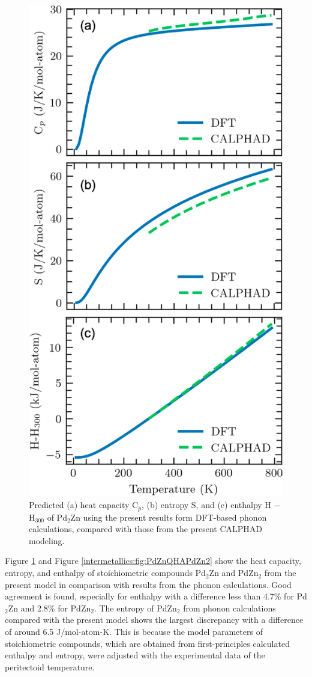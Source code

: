 \begin{figure}[H]
    \centering
    \includegraphics[width=0.45\linewidth]{intermetallics/Intermetallics-PdZnQHAPd2Zn.jpg}
    \caption{Predicted (a) heat capacity C$_p$, (b) entropy S, and (c) enthalpy H $-$ H$_{300}$ of Pd$_2$Zn using the present results form DFT-based phonon calculations, compared with those from the present CALPHAD modeling.}
    \label{intermetallics:fig:PdZnQHAPd2Zn}
\end{figure}

Figure \ref{intermetallics:fig:PdZnQHAPd2Zn} and Figure \ref{intermetallics:fig:PdZnQHAPdZn2} show the heat capacity, entropy, and enthalpy of stoichiometric compounds Pd$_2$Zn and PdZn$_2$ from the present model in comparison with results from the phonon calculations. Good agreement is found, especially for enthalpy with a difference less than 4.7\% for Pd$_2$Zn and 2.8\% for PdZn$_2$. The entropy of PdZn$_2$ from phonon calculations compared with the present model shows the largest discrepancy with a difference of around 6.5 J/mol-atom-K. This is because the model parameters of stoichiometric compounds, which are obtained from first-principles calculated enthalpy and entropy, were adjusted with the experimental data of the peritectoid temperature.

